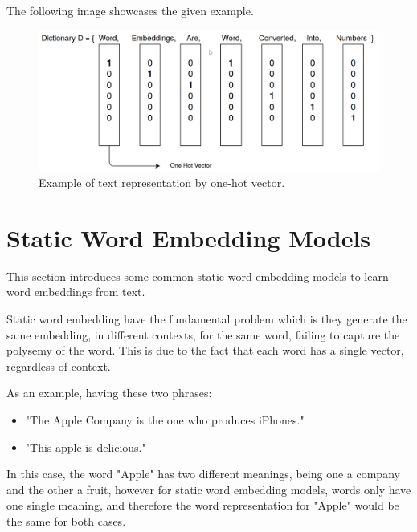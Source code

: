    \par The following image showcases the given example.
    
    
    \begin{figure}[htb]
        \centering
        \includegraphics[scale = 0.23]{Sections/3StateOfTheArt/3_images/one_hot_encoding.png}
        \caption{Example of text representation by one-hot vector.}   
    \end{figure}
    
    
    



    \section{Static Word Embedding Models}
    \label{sec:static}

    \par This section introduces some common static word embedding models to learn word embeddings from text.


    \par Static word embedding have the fundamental problem which is they generate the same embedding, in different contexts, for the same word, failing to capture the polysemy of the word. This is due to the fact that each word has a single vector, regardless of context. \cite{Mikolov2013}  
   

    \par As an example, having these two phrases:

    \begin{itemize}
        \item "The Apple Company is the one who produces iPhones."
        \item "This apple is delicious."
    \end{itemize}

    \par In this case, the word "Apple" has two different meanings, being one a company and the other a fruit, however for static word embedding models, words only have one single meaning, and therefore  the word representation for "Apple" would be the same for both cases. \cite{Batista2018}

